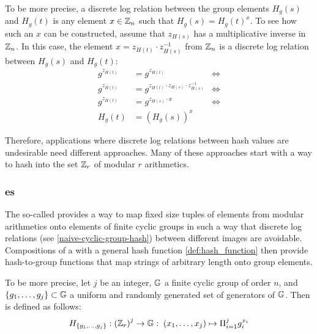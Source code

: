 \begin{example}
To be more precise, a discrete log relation between the group elements $H_g(s)$ and $H_g(t)$ is any element $x\in \mathbb{Z}_n$ such that $H_g(s) = H_g(t)^x$. To see how such an $x$ can be constructed, assume that $z_{H(s)}$ has a multiplicative inverse in $\mathbb{Z}_n$. In this case, the element $x=z_{H(t)}\cdot z_{H(s)}^{-1}$ from $\mathbb{Z}_n$ is a discrete log relation between $H_g(s)$ and $H_g(t)$:
\begin{align*}
g^{z_{H(t)}} & = g^{z_{H(t)}} & \Leftrightarrow\\
g^{z_{H(t)}} & = g^{z_{H(t)}\cdot z_{H(s)}\cdot z_{H(s)}^{-1}} & \Leftrightarrow \\
g^{z_{H(t)}} & = g^{z_{H(s)}\cdot x} & \Leftrightarrow \\
H_g(t) & = (H_g(s))^x
\end{align*}
\end{example}
Therefore, applications where discrete log relations between hash values are undesirable need different approaches. Many of these approaches start with a way to hash into the set $\mathbb{Z}_r$ of modular $r$ arithmetics.

\subsubsection{es}
\label{def:Pedersen_hash}
The so-called  \citep{Pedersen92} provides a way to map fixed size tuples of elements from modular arithmetics onto elements of finite cyclic groups in such a way that discrete log relations (see \examplename{} \ref{naive-cyclic-group-hash}) between different images are avoidable. Compositions of a  with a general hash function \eqref{def:hash_function} then provide hash-to-group functions that map strings of arbitrary length onto group elements.

To be more precise, let $j$ be an integer, $\mathbb{G}$ a finite cyclic group of order $n$, and $\{g_1, \ldots, g_j\} \subset \mathbb{G}$ a uniform and randomly generated set of generators of $\mathbb{G}$. Then  is defined as follows:
\begin{equation}\label{eq:Pedersen_hash}
H_{\{g_1,\ldots,g_j\}} : \left(\mathbb{Z}_r\right)^j \to \mathbb{G}:\; (x_1,\ldots,x_j)\mapsto \Pi_{i=1}^j g_i^{x_i}
\end{equation}

